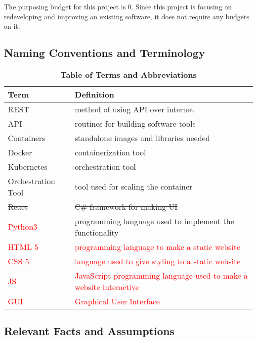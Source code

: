 \documentclass[12pt, titlepage]{article}
\begin{document}
The purposing budget for this project is 0. Since this project is focusing on redeveloping and improving an existing software, it does not require any budgets on it.

\subsection{Naming Conventions and Terminology}

\begin{table}[H]
\centering
\caption{\bf Table of Terms and Abbreviations}
\label{tab:my-table}

\begin{tabular}{|l|l|}
\hline
Term               & Definition \\ \hline
REST               & method of using API over internet         \\ \hline
API                & routines for building software tools          \\ \hline
Containers         & standalone images and libraries needed          \\ \hline
Docker             & containerization tool        \\ \hline
Kubernetes         & orchestration tool            \\ \hline
Orchestration Tool & tool used for scaling the container           \\ \hline
\st{React}              & \st{C\# framework for making UI}            \\ \hline
\textcolor{red}{Python3} & programming language used to implement the functionality \\ \hline
\textcolor{red}{HTML 5}             & \textcolor{red}{programming language to make a static website} \\ \hline
\textcolor{red}{CSS 5}              & \textcolor{red}{language used to give styling to a static website} \\ \hline
\textcolor{red}{JS}                 & \textcolor{red}{JavaScript programming language used to make a website interactive}  \\ \hline
\textcolor{red}{GUI}                                 & \textcolor{red}{Graphical User Interface} \\ \hline
\end{tabular}%

\end{table}

\subsection{Relevant Facts and Assumptions}
\end{document}

